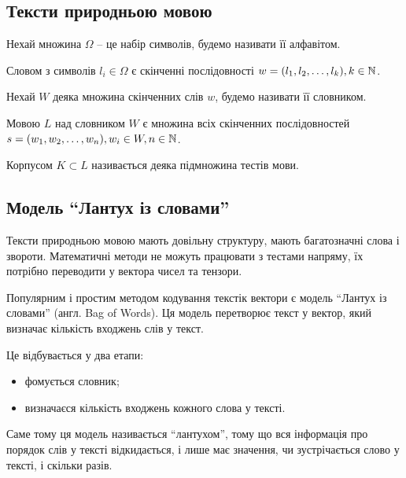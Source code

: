 \subsection{Тексти природньою мовою}

\begin{ozn}
Нехай множина $\Omega$ -- це набір символів, будемо називати її алфавітом. 
\end{ozn}

\begin{ozn}
Словом з символів $l_i \in \Omega$ є скінченні послідовності $w = (l_1,l_2, \ldots,l_k), k \in \Bbb N$. 
\end{ozn}

\begin{ozn}
Нехай $W$ деяка множина скінченних слів $w$, будемо називати її словником.
\end{ozn}

\begin{ozn}
Мовою $L$ над словником $W$ є множина всіх скінченних послідовностей $s = (w_1, w_2, \ldots, w_n), w_i \in W, n \in \Bbb N$.
\end{ozn}

\begin{ozn}
Корпусом $K \subset L$ називається деяка підмножина тестів мови.
\end{ozn}



\subsection{Модель ``Лантух із словами''}

Тексти природньою мовою мають довільну структуру, мають багатозначні слова і звороти. Математичні методи не можуть працювати з тестами напряму, їх потрібно переводити у вектора чисел та тензори.

Популярним і простим методом кодування текстік вектори є модель ``Лантух із словами'' (англ. Bag of Words). Ця модель перетворює текст у вектор, який визначає кількість входжень слів у текст.

Це відбувається у два етапи:
\begin{itemize}
 \item фомується словник;
 \item визначаєся кількість входжень кожного слова у тексті.
\end{itemize}

Саме тому ця модель називається ``лантухом'', тому що вся інформація про порядок слів у тексті відкидається, і лише має значення, чи зустрічається слово у тексті, і скільки разів. 

